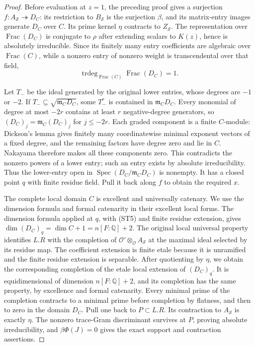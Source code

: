 \begin{proof}
Before evaluation at $z=1$, the preceding proof gives a surjection
$f:A_{\mathscr S}\twoheadrightarrow D_C$: its restriction to
$B_{\mathscr S}$ is the surjection $\beta$, and its matrix-entry
images generate $D_C$ over $C$. Its prime kernel $\eta$ contracts
to $Z_{\mathscr S}$. The representation over $\operatorname{Frac}(D_C)$
is conjugate to $\rho$ after extending scalars to $K(z)$, hence is
absolutely irreducible. Since its finitely many entry coefficients are
algebraic over $\operatorname{Frac}(C)$, while a nonzero entry of
nonzero weight is transcendental over that field,
\[
 \operatorname{trdeg}_{\operatorname{Frac}(C)}
       \operatorname{Frac}(D_C)=1.                 \tag{ST5}
\]

Let $T_-$ be the ideal generated by the original lower entries, whose
degrees are $-1$ or $-2$. If $T_-\subseteq\sqrt{\mathfrak m_C D_C}$,
some $T_-^r$ is contained in $\mathfrak m_CD_C$. Every monomial of
degree at most $-2r$ contains at least $r$ negative-degree generators,
so $(D_C)_j=\mathfrak m_C(D_C)_j$ for $j\leq-2r$. Each graded
component is a finite $C$-module: Dickson's lemma gives finitely many
coordinatewise minimal exponent vectors of a fixed degree, and the
remaining factors have degree zero and lie in $C$. Nakayama therefore
makes all these components zero. This contradicts the nonzero powers
of a lower entry; such an entry exists by absolute irreducibility.
Thus the lower-entry open in
$\operatorname{Spec}(D_C/\mathfrak m_CD_C)$ is nonempty. It has a
closed point $q$ with finite residue field. Pull it back along $f$ to
obtain the required $x$.

The complete local domain $C$ is excellent and universally catenary.
We use the dimension formula and formal catenarity in their
excellent local forms.\cite{support-commutative-algebra}
The dimension formula applied at $q$, with (ST5) and finite residue
extension, gives
$\dim(D_C)_q=\dim C+1=n[F:\mathbb Q]+2$.
The original local universal property identifies $L.R$ with the
completion of $\mathcal O'\otimes_{\mathcal O}A_{\mathscr S}$
at the maximal ideal selected by its residue map. The coefficient
extension is finite etale because it is unramified and the finite
residue extension is separable. After quotienting by $\eta$, we obtain
the corresponding completion of the etale local extension of $(D_C)_q$.
It is equidimensional of dimension $n[F:\mathbb Q]+2$, and its
completion has the same property, by excellence and formal catenarity.
Every minimal prime of the completion contracts to a minimal prime
before completion by flatness, and then to zero in the domain $D_C$.
Pull one back to $P\subset L.R$. Its contraction to $A_{\mathscr S}$
is exactly $\eta$. The nonzero trace-Gram discriminant survives at
$P$, proving absolute irreducibility, and $\beta\Phi(J)=0$ gives
the exact support and contraction assertions.
\end{proof}


